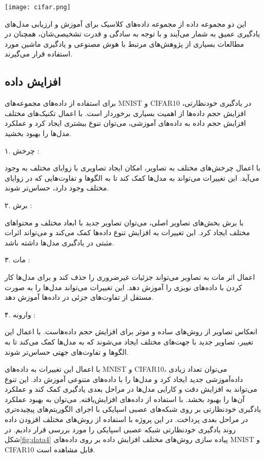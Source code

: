 \begin{minipage}{\linewidth}
	\centering
	\texttt{[image: cifar.png]}
	\captionsetup{font=small} %
	\label{fig:data2}
\end{minipage}


این دو مجموعه داده از مجموعه داده‌های کلاسیک برای آموزش و ارزیابی مدل‌های یادگیری عمیق به شمار می‌آیند و با توجه به سادگی و قدرت تشخیصی‌شان، همچنان در مطالعات بسیاری از پژوهش‌های مرتبط با هوش مصنوعی و یادگیری ماشین مورد استفاده قرار می‌گیرند.

\subsection{افزایش داده}
برای استفاده از داده‌های مجموعه‌های MNIST و CIFAR10 در یادگیری خودنظارتی، افزایش حجم داده‌ها از اهمیت بسیاری برخوردار است. با اعمال تکنیک‌های مختلف افزایش حجم داده به داده‌های آموزشی، می‌توان تنوع بیشتری ایجاد کرد و عملکرد مدل‌ها را بهبود بخشید.

۱. چرخش : 

با اعمال چرخش‌های مختلف به تصاویر، امکان ایجاد تصاویری با زوایای مختلف به وجود می‌آید. این تغییرات می‌تواند به مدل‌ها کمک کند تا به الگوها و تفاوت‌هایی که در زوایای مختلف وجود دارد، حساس‌تر شوند.

۲. برش :

 با برش بخش‌های تصاویر اصلی، می‌توان تصاویر جدید با ابعاد مختلف و محتواهای مختلف ایجاد کرد. این تغییرات به افزایش تنوع داده‌ها کمک می‌کند و می‌تواند اثرات مثبتی در یادگیری مدل‌ها داشته باشد.

۳. مات  :

 اعمال اثر مات به تصاویر می‌تواند جزئیات غیرضروری را حذف کند و برای مدل‌ها کار کردن با داده‌های نویزی را آموزش دهد. این تغییرات می‌تواند مدل‌ها را به صورت مستقل از تفاوت‌های جزئی در داده‌ها آموزش دهد.

۴. وارونه  :

انعکاس تصاویر از روش‌های ساده و موثر برای افزایش حجم داده‌هاست. با اعمال این تغییر، تصاویر جدید با جهت‌های مختلف ایجاد می‌شوند که به مدل‌ها کمک می‌کند تا به الگوها و تفاوت‌های جهتی حساس‌تر شوند.

با اعمال این تغییرات به داده‌های MNIST و CIFAR10، می‌توان تعداد زیادی داده‌آموزشی جدید ایجاد کرد و مدل‌ها را با داده‌های متنوعی آموزش داد. این تنوع می‌تواند به افزایش دقت و کارایی مدل‌ها در مراحل بعدی یادگیری کمک کند و عملکرد آن‌ها را بهبود بخشد. با استفاده از داده‌های افزایش‌یافته, می‌توان به بهبود عملکرد یادگیری خودنظارتی بر روی شبکه‌های عصبی اسپایکی با اجرای الگوریتم‌های پیچیده‌تری در مراحل بعدی پرداخت. در این پروژه با استفاده از روش‌های مختلف افزودن داده روند یادگیری خودنظارتی شبکه عصبی اسپایکی را مورد بررسی قرار دادیم. در شکل\ref{fig:data4}  پیاده سازی روش‌های مختلف افزایش داده  بر روی داده‌های MNIST  و  CIFAR10 قابل مشاهده است.

